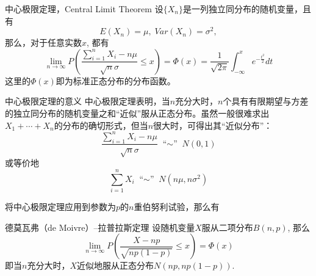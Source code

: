 
\begin{frame}

\begin{block}{中心极限定理，Central Limit Theorem}
设$\{X_n\}$是一列独立同分布的随机变量，且有
\[E(X_n) = \mu, \; Var(X_n) = \sigma^2,\]
那么，对于任意实数$x$, 都有
\[\lim\limits_{n\to\infty} P\left( \dfrac{\sum\limits_{i=1}^n X_i - n\mu}{\sqrt{n}\sigma} \le x \right) = \Phi(x) = \dfrac{1}{\sqrt{2\pi}} \int_{-\infty}^x e^{-\frac{t^2}{2}} dt\]
这里的$\Phi(x)$即为标准正态分布的分布函数。
\end{block}

\end{frame}


\begin{frame}

\begin{block}{中心极限定理的意义}
中心极限定理表明，当$n$充分大时，$n$个具有有限期望与方差的独立同分布的随机变量之和``近似''服从正态分布。虽然一般很难求出$X_1+\cdots+X_n$的分布的确切形式，但当$n$很大时，可得出其``近似分布''：
\[\dfrac{\sum\limits_{i=1}^n X_i - n\mu}{\sqrt{n}\sigma} \; \text{``$\sim$''} \; N(0,1)\]
或等价地
\[\sum\limits_{i=1}^n X_i \; \text{``$\sim$''} \; N(n\mu,n\sigma^2)\]
\end{block}

\end{frame}


\begin{frame}

将中心极限定理应用到参数为$p$的$n$重伯努利试验，那么有
\vspace{0.5em}
\begin{block}{德莫瓦弗（de Moivre）--拉普拉斯定理}
设随机变量$X$服从二项分布$B(n,p)$, 那么
\[\lim\limits_{n\to\infty} P\left( \dfrac{X - np}{\sqrt{np(1-p)}} \le x \right) = \Phi(x)\]
即当$n$充分大时，$X$近似地服从正态分布$N(np,np(1-p))$.
\end{block}

\end{frame}


